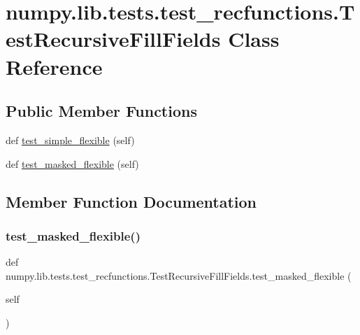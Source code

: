 \hypertarget{classnumpy_1_1lib_1_1tests_1_1test__recfunctions_1_1TestRecursiveFillFields}{}\section{numpy.\+lib.\+tests.\+test\+\_\+recfunctions.\+Test\+Recursive\+Fill\+Fields Class Reference}
\label{classnumpy_1_1lib_1_1tests_1_1test__recfunctions_1_1TestRecursiveFillFields}
\subsection*{Public Member Functions}
\begin{DoxyCompactItemize}
\item 
def \hyperlink{classnumpy_1_1lib_1_1tests_1_1test__recfunctions_1_1TestRecursiveFillFields_af2cf4c4e7301224beeac9a6295caa001}{test\+\_\+simple\+\_\+flexible} (self)
\item 
def \hyperlink{classnumpy_1_1lib_1_1tests_1_1test__recfunctions_1_1TestRecursiveFillFields_acb4ace3aa7a2b4bb88a6366af117a7b6}{test\+\_\+masked\+\_\+flexible} (self)
\end{DoxyCompactItemize}


\subsection{Member Function Documentation}
\mbox{\label{classnumpy_1_1lib_1_1tests_1_1test__recfunctions_1_1TestRecursiveFillFields_acb4ace3aa7a2b4bb88a6366af117a7b6}} 
\subsubsection{\texorpdfstring{test\+\_\+masked\+\_\+flexible()}{test\_masked\_flexible()}}
{\footnotesize\ttfamily def numpy.\+lib.\+tests.\+test\+\_\+recfunctions.\+Test\+Recursive\+Fill\+Fields.\+test\+\_\+masked\+\_\+flexible (\begin{DoxyParamCaption}\item[{}]{self }\end{DoxyParamCaption})}

